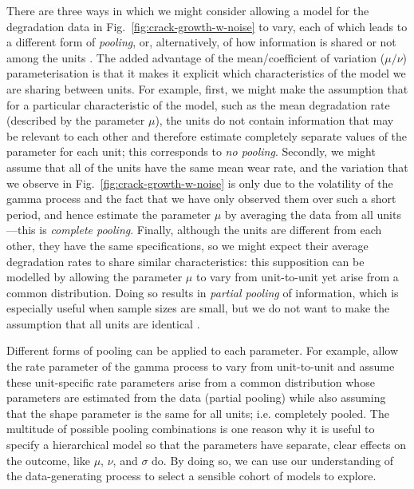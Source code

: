 There are three ways in which we might consider allowing a model for the degradation data in Fig.~\ref{fig:crack-growth-w-noise} to vary, each of which leads to a different form of \emph{pooling}, or, alternatively, of how information is shared or not among the units \citep{Johnson_2022}. The added advantage of the mean/coefficient of variation ($\mu/\nu$) parameterisation is that it makes it explicit which characteristics of the model we are sharing between units. For example, first, we might make the assumption that for a particular characteristic of the model, such as the mean degradation rate (described by the parameter $\mu$), the units do not contain information that may be relevant to each other and therefore estimate completely separate values of the parameter for each unit; this corresponds to \emph{no pooling}. Secondly, we might assume that all of the units have the same mean wear rate, and the variation that we observe in Fig.~\ref{fig:crack-growth-w-noise} is only due to the volatility of the gamma process and the fact that we have only observed them over such a short period, and hence estimate the parameter $\mu$ by averaging the data from all units---this is \emph{complete pooling}. Finally, although the units are different from each other, they have the same specifications, so we might expect their average degradation rates to share similar characteristics: this supposition can be modelled by allowing the parameter $\mu$ to vary from unit-to-unit yet arise from a common distribution. Doing so results in \emph{partial pooling} of information, which is especially useful when sample sizes are small, but we do not want to make the assumption that all units are identical \cite[Section~13.1]{McElreath_2020}.

Different forms of pooling can be applied to each parameter. For example, \citet{lawless2004} allow the rate parameter of the gamma process to vary from unit-to-unit and assume these unit-specific rate parameters arise from a common distribution whose parameters are estimated from the data (partial pooling) while also assuming that the shape parameter is the same for all units; i.e. completely pooled. The multitude of possible pooling combinations is one reason why it is useful to specify a hierarchical model so that the parameters have separate, clear effects on the outcome, like $\mu$, $\nu$, and $\sigma$ do. By doing so, we can use our understanding of the data-generating process to select a sensible cohort of models to explore.

